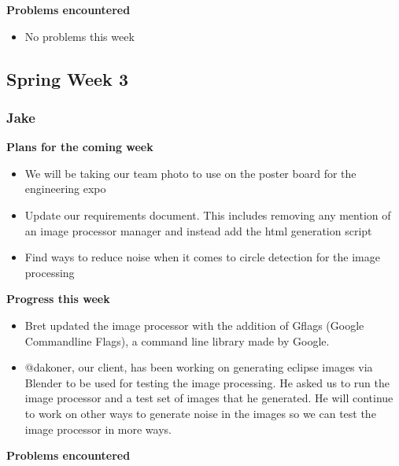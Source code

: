 \documentclass[10pt, onecolumn, draftclsnofoot, letterpaper, compsoc]{IEEEtran}
\begin{document}
    \noindent \textbf{Problems encountered}

    \begin{itemize}

    \item No problems this week

    \end{itemize}

\subsection{Spring Week 3}

    \subsubsection{Jake}

    \noindent \textbf{Plans for the coming week}

    \begin{itemize}

    \item We will be taking our team photo to use on the poster board for the engineering expo
    \item Update our requirements document. This includes removing any mention of an image processor manager and instead add the html generation script
    \item Find ways to reduce noise when it comes to circle detection for the image processing

    \end{itemize}

    \noindent \textbf{Progress this week}

    \begin{itemize}

    \item Bret updated the image processor with the addition of Gflags (Google Commandline Flags), a command line library made by Google.
    \item @dakoner, our client, has been working on generating eclipse images via Blender to be used for testing the image processing. He asked us to run the image processor and a test set of images that he generated. He will continue to work on other ways to generate noise in the images so we can test the image processor in more ways.

    \end{itemize}

    \noindent \textbf{Problems encountered}
\end{document}
